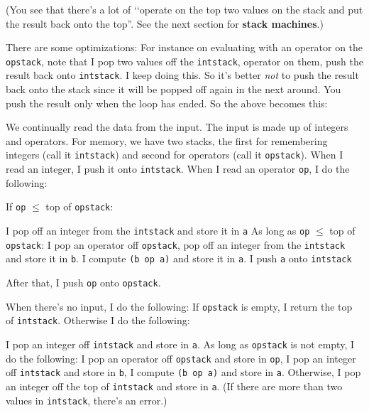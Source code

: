 (You see that there's a lot of \lq\lq operate on the
top two values on the stack and put the result back onto the top''.
See the next section for \textbf{stack machines}.)

There are some optimizations:
For instance on evaluating with an operator on the
\texttt{opstack},
note that I pop two values off the \texttt{intstack},
operator on them, push the result back onto \texttt{intstack}.
I keep doing this.
So it's better \textit{not} to push the result back onto the
stack since it will be popped off again in the next around.
You push the result only when the loop has ended.
So the above becomes this:
\begin{enumerate}[nosep]
  \li We continually read the data from the input. The input
  is made up of integers and operators.
  \li For memory, we have two stacks, the first
  for remembering
  integers (call it \texttt{intstack}) and second for operators
  (call it \texttt{opstack}).
  \li When I read an integer, I push it onto \texttt{intstack}.
  \li When I read an operator \texttt{op}, I do the following:
  \begin{enumerate}[nosep]
    \li If \texttt{op} $\leq$ top of \texttt{opstack}:
    \begin{enumerate}[nosep]
      \li I pop off an integer from the \texttt{intstack} and store it
      in \texttt{a}
      \li As long as \texttt{op} $\leq$ top of \texttt{opstack}:
      I pop an operator off \texttt{opstack},
      pop off an integer from the \texttt{intstack}
      and store it in \texttt{b}.
      I compute \texttt{(b op a)} and store it in \texttt{a}.
      \li I push \texttt{a} onto \texttt{intstack}
    \end{enumerate}
    \li After that, I push \texttt{op} onto \texttt{opstack}.  
  \end{enumerate}
  \li When there's no input, I do the following:
  If \texttt{opstack} is empty,
  I return the top of \texttt{intstack}.
  Otherwise I do the following:
  \begin{enumerate}[nosep]
    \li I pop an integer off \texttt{intstack} and store in \texttt{a}.
    \li As long as \texttt{opstack} is not empty, I do the following:
    I pop an operator off \texttt{opstack} and store in \texttt{op},
    I pop an integer off \texttt{intstack} and store in \texttt{b},
    I compute \texttt{(b op a)} and store in \texttt{a}.
    \li Otherwise, I pop an integer off the top of \texttt{intstack}
    and store in \texttt{a}.
    (If there are more than two values in \texttt{intstack}, there's an
    error.)
  \end{enumerate}
\end{enumerate}



